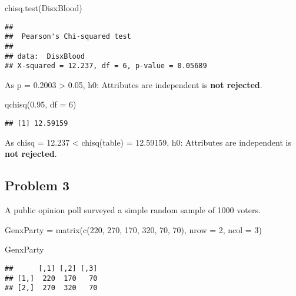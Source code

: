\documentclass[
]{article}
\newenvironment{Shaded}{\begin{snugshade}}{\end{snugshade}}
\newcommand{\AttributeTok}[1]{\textcolor[rgb]{0.77,0.63,0.00}{#1}}
\newcommand{\DecValTok}[1]{\textcolor[rgb]{0.00,0.00,0.81}{#1}}
\newcommand{\FloatTok}[1]{\textcolor[rgb]{0.00,0.00,0.81}{#1}}
\newcommand{\FunctionTok}[1]{\textcolor[rgb]{0.00,0.00,0.00}{#1}}
\newcommand{\NormalTok}[1]{#1}
\newcommand{\OtherTok}[1]{\textcolor[rgb]{0.56,0.35,0.01}{#1}}
\begin{document}
\begin{Shaded}
\begin{Highlighting}[]
\FunctionTok{chisq.test}\NormalTok{(DisxBlood)}
\end{Highlighting}
\end{Shaded}

\begin{verbatim}
## 
##  Pearson's Chi-squared test
## 
## data:  DisxBlood
## X-squared = 12.237, df = 6, p-value = 0.05689
\end{verbatim}

As p = 0.2003 \textgreater{} 0.05, h0: Attributes are independent is
\textbf{not rejected}.

\begin{Shaded}
\begin{Highlighting}[]
\FunctionTok{qchisq}\NormalTok{(}\FloatTok{0.95}\NormalTok{, }\AttributeTok{df =} \DecValTok{6}\NormalTok{)}
\end{Highlighting}
\end{Shaded}

\begin{verbatim}
## [1] 12.59159
\end{verbatim}

As chisq = 12.237 \textless{} chisq(table) = 12.59159, h0: Attributes
are independent is \textbf{not rejected}.

\hypertarget{problem-3-1}{%
\subsection{Problem 3}\label{problem-3-1}}

A public opinion poll surveyed a simple random sample of 1000 voters.

\begin{Shaded}
\begin{Highlighting}[]
\NormalTok{GenxParty }\OtherTok{=} \FunctionTok{matrix}\NormalTok{(}\FunctionTok{c}\NormalTok{(}\DecValTok{220}\NormalTok{, }\DecValTok{270}\NormalTok{, }\DecValTok{170}\NormalTok{, }\DecValTok{320}\NormalTok{, }\DecValTok{70}\NormalTok{, }\DecValTok{70}\NormalTok{), }\AttributeTok{nrow =} \DecValTok{2}\NormalTok{, }\AttributeTok{ncol =} \DecValTok{3}\NormalTok{)}

\NormalTok{GenxParty}
\end{Highlighting}
\end{Shaded}

\begin{verbatim}
##      [,1] [,2] [,3]
## [1,]  220  170   70
## [2,]  270  320   70
\end{verbatim}
\end{document}
